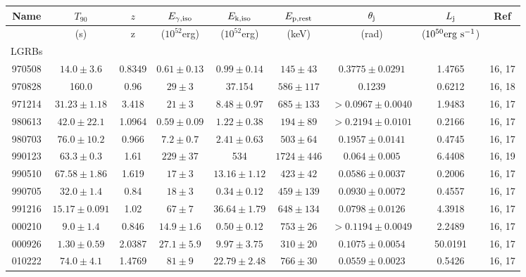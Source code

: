 \documentclass[a4paper,fleqn,usenatbib]{mnras}
\begin{document}
 \begin{table*}
 \contcaption{}
 \label{tab:continued1}
\begin{tabular}[width=1.0 \linewidth]{ccccccccc}
\hline
\hline
Name & $T_{90}$ & $z$ & $E_{\rm \gamma,\rm iso}$ & $E_{\rm k,\rm iso}$ & $E_{\rm p,\rm rest}$ & $\theta_{\rm j}$ & $L_{\rm j}$ &  Ref  \\
\hline
      & (s) & z & ($10^{52}$\rm erg) & ($10^{52}$\rm erg) &(\rm keV) & (rad) & ($\rm 10^{50} erg\rm~s^{-1}$) &  \\
\hline
 LGRBs  \\
\hline
 970508 &	$14.0 \pm 3.6$ &	0.8349 &	$0.61 \pm 0.13$ &	$0.99\pm0.14$ &	$145 \pm 43 $ &	$0.3775\pm0.0291$ &	1.4765 &	16, 17 \\																																																																					970828 &	160.0 &	0.96 &	$29 \pm 3$ &	    37.154 &	$586 \pm 117$ &	0.1239 &	0.6212 &	16, 18 \\																																																																					971214 &	$31.23\pm 1.18$ &	3.418 &	$21 \pm 3 $ &	$8.48\pm 0.97$ &	$685 \pm 133$ &	$>0.0967\pm 0.0040$ &	1.9483 &	16, 17 \\																																																																					980613 &	$42.0 \pm 22.1$ &	1.0964  &	$0.59 \pm 0.09 $ &	 $1.22\pm0.38$ &	$194\pm89$ &	$ >0.2194\pm 0.0101$ &	0.2166 &	16, 17 \\																																																																					980703 &	$76.0 \pm 10.2$ &	0.966 &	$7.2 \pm 0.7 $ &	 $2.41\pm0.63$ &	$503 \pm 64$ &	$0.1957\pm 0.0141$ &	0.4745 &	16, 17 \\																																																																					990123 &	$63.3 \pm 0.3$ &	1.61 &	$229 \pm 37 $ &	534 &	$1724 \pm 446$ &	$0.064 \pm 0.005$ &	6.4408 &	16, 19 \\																																																																					990510 &	$67.58 \pm1.86$ &	1.619 &	$17 \pm 3 $ &	$13.16\pm1.12$ &	$423 \pm 42$ &	$0.0586\pm 0.0037$ &	0.2006 &	16, 17 \\																																																																					990705 &	$32.0 \pm 1.4$ &	0.84 &	$18 \pm 3 $ &	 $0.34\pm0.12$ &	$459 \pm 139$ &	$0.0930\pm 0.0072$ &	0.4557 &	16, 17 \\																																																																					991216 &	$15.17\pm0.091$ &	1.02  &	$67 \pm 7 $ &	$ 36.64\pm1.79$ &	$648\pm134$ &	 $0.0798\pm0.0126$ &	4.3918 &	16, 17 \\																																																																					000210 &	$9.0 \pm1.4$ &	0.846 &	$14.9 \pm 1.6 $ &	 $0.50 \pm 0.12$ &	$753 \pm 26$ &	$> 0.1194\pm0.0049$ &	2.2489 &	16, 17 \\																																																																					000926 &	$1.30 \pm 0.59$ &	2.0387 &	$27.1\pm5.9 $ &	$9.97 \pm 3.75$ &	$310\pm20$ &	$0.1075\pm0.0054$ &	50.0191 &	16, 17 \\																																																																					010222 &	$74.0 \pm4.1$ &	1.4769  &	$81 \pm 9 $ &	 $22.79\pm2.48$ &	$766 \pm 30$ &	$0.0559\pm0.0023$ &	0.5426 &	16, 17 
\end{tabular}
\end{table*}
\end{document}
